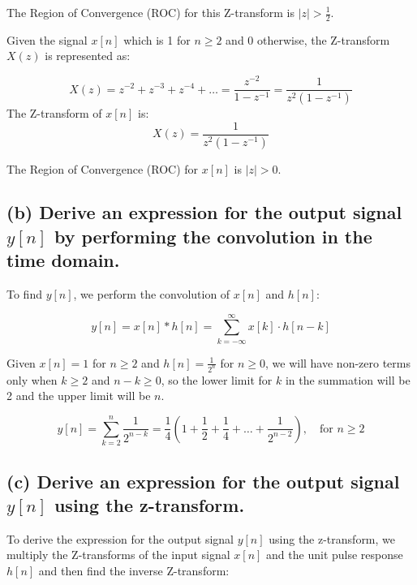 The Region of Convergence (ROC) for this Z-transform is \( |z| > \frac{1}{2} \).


Given the signal \(x[n]\) which is 1 for \(n \geq 2\) and 0 otherwise, the Z-transform \(X(z)\) is represented as:

\begin{equation*}
    X(z) = z^{-2} + z^{-3} + z^{-4} + \ldots = \frac{z^{-2}}{1 - z^{-1}} = \frac{1}{z^2(1 - z^{-1})}
\end{equation*}
The Z-transform of \( x[n] \) is:
\begin{equation*}
    X(z) = \frac{1}{z^2(1 - z^{-1})}
\end{equation*}

The Region of Convergence (ROC) for \( x[n] \) is \( |z| > 0 \).

\subsection*{(b) Derive an expression for the output signal $y[n]$ by performing the convolution in the time domain.}

To find \( y[n] \), we perform the convolution of \( x[n] \) and \( h[n] \):

\begin{equation*}
    y[n] = x[n] * h[n] = \sum_{k=-\infty}^{\infty} x[k] \cdot h[n - k]
\end{equation*}

Given \( x[n] = 1 \) for \( n \geq 2 \) and \( h[n] = \frac{1}{2^n} \) for \( n \geq 0 \), we will have non-zero terms only when \(k \geq 2\) and \(n - k \geq 0\), so the lower limit for \(k\) in the summation will be 2 and the upper limit will be \(n\).

\begin{equation*}
    y[n] = \sum_{k=2}^{n} \frac{1}{2^{n - k}} = \frac{1}{4} \left(1 + \frac{1}{2} + \frac{1}{4} + \ldots + \frac{1}{2^{n - 2}} \right), \quad \text{for } n \geq 2
\end{equation*}



\subsection*{(c) Derive an expression for the output signal $y[n]$ using the z-transform.}


To derive the expression for the output signal \(y[n]\) using the z-transform, we multiply the Z-transforms of the input signal \(x[n]\) and the unit pulse response \(h[n]\) and then find the inverse Z-transform:

